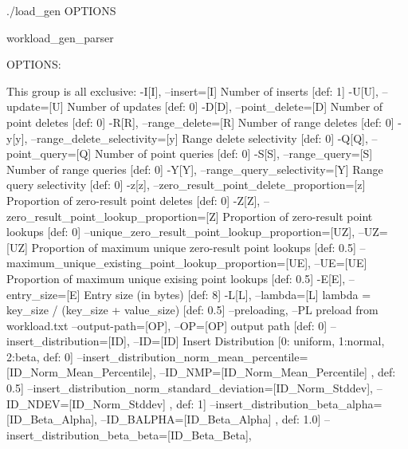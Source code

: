 ./load_gen {OPTIONS}

    workload_gen_parser

  OPTIONS:

      This group is all exclusive:
        -I[I], --insert=[I]               Number of inserts [def: 1]
        -U[U], --update=[U]               Number of updates [def: 0]
        -D[D], --point_delete=[D]         Number of point deletes [def: 0]
        -R[R], --range_delete=[R]         Number of range deletes [def: 0]
        -y[y],
        --range_delete_selectivity=[y]    Range delete selectivity [def: 0]
        -Q[Q], --point_query=[Q]          Number of point queries [def: 0]
        -S[S], --range_query=[S]          Number of range queries [def: 0]
        -Y[Y],
        --range_query_selectivity=[Y]     Range query selectivity [def: 0]
        -z[z],
        --zero_result_point_delete_proportion=[z]
                                          Proportion of zero-result point
                                          deletes [def: 0]
        -Z[Z],
        --zero_result_point_lookup_proportion=[Z]
                                          Proportion of zero-result point
                                          lookups [def: 0]
        --unique_zero_result_point_lookup_proportion=[UZ],
        --UZ=[UZ]                         Proportion of maximum unique
                                          zero-result point lookups [def: 0.5]
        --maximum_unique_existing_point_lookup_proportion=[UE],
        --UE=[UE]                         Proportion of maximum unique exising
                                          point lookups [def: 0.5]
        -E[E], --entry_size=[E]           Entry size (in bytes) [def: 8]
        -L[L], --lambda=[L]               lambda = key_size / (key_size +
                                          value_size) [def: 0.5]
        --preloading, --PL                preload from workload.txt
        --output-path=[OP], --OP=[OP]     output path [def: 0]
        --insert_distribution=[ID],
        --ID=[ID]                         Insert Distribution [0: uniform,
                                          1:normal, 2:beta, def: 0]
        --insert_distribution_norm_mean_percentile=[ID_Norm_Mean_Percentile],
        --ID_NMP=[ID_Norm_Mean_Percentile]
                                          , def: 0.5]
        --insert_distribution_norm_standard_deviation=[ID_Norm_Stddev],
        --ID_NDEV=[ID_Norm_Stddev]        , def: 1]
        --insert_distribution_beta_alpha=[ID_Beta_Alpha],
        --ID_BALPHA=[ID_Beta_Alpha]       , def: 1.0]
        --insert_distribution_beta_beta=[ID_Beta_Beta],
